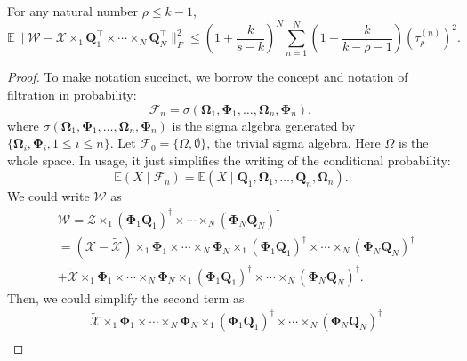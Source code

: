 \begin{lem}
\label{lemma:probabilistic_err_linkage_tensor}
For any natural number $\rho\le k-1$,
\begin{equation}
\mathbb{E} \|\mathscr{W} - \mathscr{X}\times_1 \mathbf{Q}_1^\top \times \cdots \times_N \mathbf{Q}_N^\top\|_F^2\le 
\left(1+\frac{k}{s-k}\right)^N  \sum_{n=1}^N \left(1+\frac{k}{k-\rho-1}\right)(\tau^{(n)}_\rho)^2. 
\end{equation}
\begin{proof}
To make notation succinct, we borrow the concept and notation of filtration in probability:
\begin{equation}
\mathcal{F}_n = \sigma(\mathbf{\Omega}_1, \mathbf{\Phi}_1, \dots, \mathbf{\Omega}_n, \mathbf{\Phi}_n), 
\end{equation}
where $\sigma(\mathbf{\Omega}_1, \mathbf{\Phi}_1, \dots, \mathbf{\Omega}_n, \mathbf{\Phi}_n)$ is the sigma algebra generated by $\{\mathbf{\Omega}_i, \mathbf{\Phi}_i, 1\le i\le n\}$. Let $\mathcal{F}_0 = \{\Omega, \emptyset\}$,  the trivial sigma algebra. Here $\Omega$ is the whole space. In usage, it just simplifies the writing of the conditional probability:
\begin{equation}
\mathbb{E} (X \mid \mathcal{F}_n) = \mathbb{E} (X\mid \mathbf{Q}_1,\mathbf{\Omega}_1, \dots, \mathbf{Q}_n,\mathbf{\Omega}_n). 
\end{equation}
We could write $\mathscr{W}$ as 
\begin{equation}
\begin{aligned}
&\mathscr{W} = \mathscr{Z}\times_1 (\mathbf{\Phi}_1 \mathbf{Q}_1)^\dag \times \cdots \times_N (\mathbf{\Phi}_N \mathbf{Q}_N)^\dag \\
& = (\mathscr{X} -  \tilde{\mathscr{X}})\times_1 \mathbf{\Phi}_1 \times \cdots \times_N \mathbf{\Phi}_N  \times_1 (\mathbf{\Phi}_1 \mathbf{Q}_1)^\dag \times \cdots \times_N (\mathbf{\Phi}_N \mathbf{Q}_N)^\dag 
\\
&+ \tilde{\mathscr{X}}\times_1 \mathbf{\Phi}_1 \times \cdots \times_N \mathbf{\Phi}_N \times_1 (\mathbf{\Phi}_1 \mathbf{Q}_1)^\dag \times \cdots \times_N (\mathbf{\Phi}_N \mathbf{Q}_N)^\dag.
\end{aligned}
\end{equation}
Then, we could simplify the second term as 
\begin{equation}
\begin{aligned}
&\tilde{\mathscr{X}}\times_1 \mathbf{\Phi}_1 \times \cdots \times_N \mathbf{\Phi}_N \times_1 (\mathbf{\Phi}_1 \mathbf{Q}_1)^\dag \times \cdots \times_N (\mathbf{\Phi}_N \mathbf{Q}_N)^\dag   \\

\end{aligned}
\end{equation}
\end{proof}
\end{lem}
